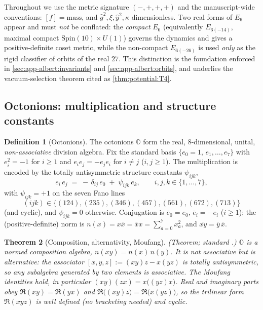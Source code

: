 \documentclass[11pt]{article}
\theoremstyle{plain}
\newtheorem{theorem}{Theorem}[section]
\theoremstyle{definition}
\newtheorem{definition}[theorem]{Definition}
\theoremstyle{remark}
\begin{document}
Throughout we use the metric signature $(-,+,+,+)$ and the manuscript-wide
conventions: $[f]=\text{mass}$, and $\hat g^2,\xi,\hat y^2,\kappa$ dimensionless.
Two real forms of $E_6$ appear and must \emph{not} be conflated: the
\emph{compact} $E_6$ (equivalently $E_{6(-14)}$, maximal compact
$\mathrm{Spin}(10)\times U(1)$) governs the dynamics and gives a
positive-definite coset metric, while the non-compact $E_{6(-26)}$ is used
\emph{only} as the rigid classifier of orbits of the real $27$. This distinction
is the foundation enforced in \autoref{sec:app-albert:invariants} and
\autoref{sec:app-albert:orbits}, and underlies the vacuum-selection theorem cited
as \autoref{thm:potential:T4}.

\subsection{Octonions: multiplication and structure constants}
\label{sec:app-albert:octonions}

\begin{definition}[Octonions]\label{def:app-albert:octonions}
The octonions $\mathbb O$ form the real, $8$-dimensional, unital,
\emph{non-associative} division algebra. Fix the standard basis
$\{e_0=1,\,e_1,\dots,e_7\}$ with $e_i^2=-1$ for $i\ge 1$ and $e_i e_j=-e_j e_i$
for $i\neq j$ ($i,j\ge 1$). The multiplication is encoded by the totally
antisymmetric structure constants $\psi_{ijk}$,
\begin{equation}\label{eq:app-albert:struct}
  e_i\, e_j \;=\; -\,\delta_{ij}\,e_0 \;+\; \psi_{ijk}\,e_k ,
  \qquad i,j,k\in\{1,\dots,7\},
\end{equation}
with $\psi_{ijk}=+1$ on the seven Fano lines
\begin{equation}\label{eq:app-albert:fano}
  (ijk)\in\bigl\{(124),(235),(346),(457),(561),(672),(713)\bigr\}
\end{equation}
(and cyclic), and $\psi_{ijk}=0$ otherwise. Conjugation is
$\bar e_0=e_0$, $\bar e_i=-e_i$ ($i\ge1$); the (positive-definite) norm is
$n(x)=x\bar x=\bar x x=\sum_{a=0}^{7}x_a^2$, and $\overline{xy}=\bar y\,\bar x$.
\end{definition}

\begin{theorem}[Composition, alternativity, Moufang]\label{thm:app-albert:moufang}
\textup{(Theorem; standard \cite{Baez:2002,Springer:2000}.)}
$\mathbb O$ is a normed composition algebra, $n(xy)=n(x)\,n(y)$. It is not
associative but is \emph{alternative}: the associator
$[x,y,z]:=(xy)z-x(yz)$ is totally antisymmetric, so any subalgebra generated by
two elements is associative. The Moufang identities hold, in particular
$(xy)(zx)=x\bigl((yz)x\bigr)$. Real and imaginary parts obey
$\Re(xy)=\Re(yx)$ and $\Re\bigl((xy)z\bigr)=\Re\bigl(x(yz)\bigr)$, so the
trilinear form $\Re(xyz)$ is well defined (no bracketing needed) and cyclic.
\end{theorem}
\end{document}
